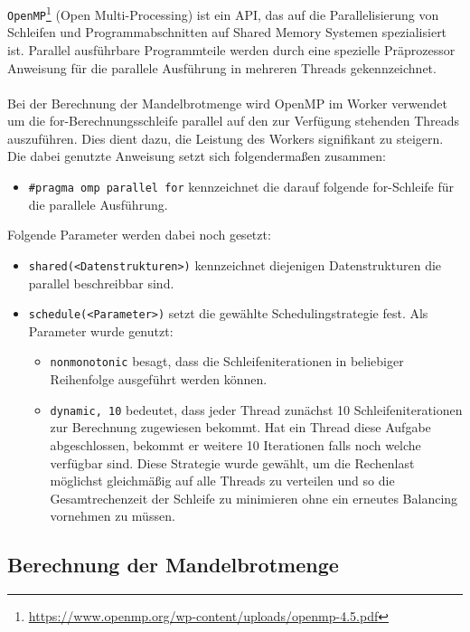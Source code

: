 \verb|OpenMP|\footnote{\url{https://www.openmp.org/wp-content/uploads/openmp-4.5.pdf}} (Open Multi-Processing) ist ein API, das auf die Parallelisierung von Schleifen und Programmabschnitten auf Shared Memory Systemen spezialisiert ist. Parallel ausführbare Programmteile werden durch eine spezielle Präprozessor Anweisung für die parallele Ausführung in mehreren Threads gekennzeichnet.
\\ \\
Bei der Berechnung der Mandelbrotmenge wird OpenMP im Worker verwendet um die for-Berechnungsschleife parallel auf den zur Verfügung stehenden Threads auszuführen. Dies dient dazu, die Leistung des Workers signifikant zu steigern. Die dabei genutzte Anweisung setzt sich folgendermaßen zusammen:

\begin{itemize}
	\item \verb|#pragma omp parallel for| kennzeichnet die darauf folgende for-Schleife für die parallele Ausführung.
\end{itemize}

Folgende Parameter werden dabei noch gesetzt:

\begin{itemize}
	\item \verb|shared(<Datenstrukturen>)| kennzeichnet diejenigen Datenstrukturen die parallel beschreibbar sind.
	
	\item \verb|schedule(<Parameter>)| setzt die gewählte Schedulingstrategie fest. Als Parameter wurde genutzt:
	
	\begin{itemize}
		\item \verb|nonmonotonic| besagt, dass die Schleifeniterationen in beliebiger Reihenfolge ausgeführt werden können.
		
		\item \verb|dynamic, 10| bedeutet, dass jeder Thread zunächst 10 Schleifeniterationen zur Berechnung zugewiesen bekommt. Hat ein Thread diese Aufgabe abgeschlossen, bekommt er weitere 10 Iterationen falls noch welche verfügbar sind. Diese Strategie wurde gewählt, um die Rechenlast möglichst gleichmäßig auf alle Threads zu verteilen und so die Gesamtrechenzeit der Schleife zu minimieren ohne ein erneutes Balancing vornehmen zu müssen.
	\end{itemize}
\end{itemize}

\subsection{Berechnung der Mandelbrotmenge}\label{sec:mandelbrot_calculation}

